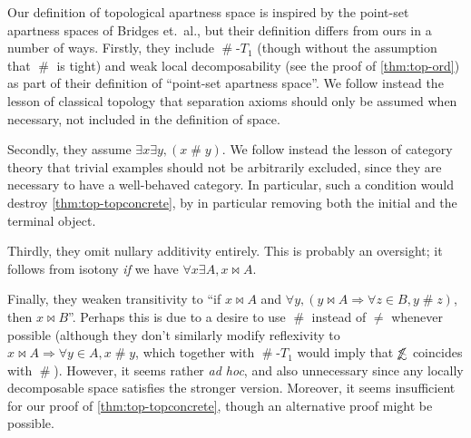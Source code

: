 \documentclass{article}
\def\apart{\mathrel{\#}}
\def\oapt{\mathrel{\!\not\,\not\lesssim}}
\let\implies\Rightarrow
\begin{document}
\begin{rmk}
  Our definition of topological apartness space is inspired by the point-set apartness spaces of Bridges et.~al., but their definition differs from ours in a number of ways.
  Firstly, they include $\apart$-$T_1$ (though without the assumption that $\apart$ is tight) and weak local decomposability (see the proof of \cref{thm:top-ord}) as part of their definition of ``point-set apartness space''.
  We follow instead the lesson of classical topology that separation axioms should only be assumed when necessary, not included in the definition of space.
  
  Secondly, they assume $\exists x \exists y,(x\apart y)$.
  We follow instead the lesson of category theory that trivial examples should not be arbitrarily excluded, since they are necessary to have a well-behaved category.
  In particular, such a condition would destroy \cref{thm:top-topconcrete}, by in particular removing both the initial and the terminal object.

  Thirdly, they omit nullary additivity entirely.
  This is probably an oversight; it follows from isotony \emph{if} we have $\forall x \exists A, x\bowtie A$.

  Finally, they weaken transitivity to ``if $x\bowtie A$ and $\forall y, (y\bowtie A \implies \forall z\in B, y\apart z)$, then $x\bowtie B$''.
  Perhaps this is due to a desire to use $\apart$ instead of $\neq$ whenever possible (although they don't similarly modify reflexivity to $x\bowtie A \implies \forall y\in A, x\apart y$, which together with $\apart$-$T_1$ would imply that $\oapt$ coincides with $\apart$).
  However, it seems rather \emph{ad hoc}, and also unnecessary since any locally decomposable space satisfies the stronger version.
  Moreover, it seems insufficient for our proof of \cref{thm:top-topconcrete}, though an alternative proof might be possible.
\end{rmk}
\end{document}
